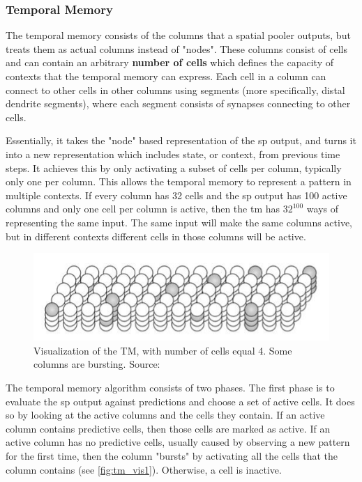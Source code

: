 \subsubsection{Temporal Memory}
\label{sec:temporal_memory}
The temporal memory consists of the columns that a spatial pooler outputs, but treats them as actual columns instead of "nodes". These columns consist of cells and can contain an arbitrary \textbf{number of cells} which defines the capacity of contexts that the temporal memory can express. Each cell in a column can connect to other cells in other columns using segments (more specifically, distal dendrite segments), where each segment consists of synapses connecting to other cells.
\par
Essentially, it takes the "node" based representation of the \gls*{sp} output, and turns it into a new representation which includes state, or context, from previous time steps. It achieves this by only activating a subset of cells per column, typically only one per column. This allows the temporal memory to represent a pattern in multiple contexts. If every column has 32 cells and the \gls*{sp} output has 100 active columns and only one cell per column is active, then the \gls*{tm} has $32^{100}$ ways of representing the same input. The same input will make the same columns active, but in different contexts different cells in those columns will be active.
\begin{figure}[H]
    \centering
    \includegraphics[width=\linewidth]{resources/related_works/tm_vis_alt2.png}
    \caption{Visualization of the TM, with number of cells equal 4. Some columns are bursting. Source: \cite{BAMI}}
\end{figure}
\par
The temporal memory algorithm consists of two phases. The first phase is to evaluate the \gls*{sp} output against predictions and choose a set of active cells. It does so by looking at the active columns and the cells they contain. If an active column contains predictive cells, then those cells are marked as active. If an active column has no predictive cells, usually caused by observing a new pattern for the first time, then the column "bursts" by activating all the cells that the column contains (see \autoref{fig:tm_vis1}). Otherwise, a cell is inactive.

